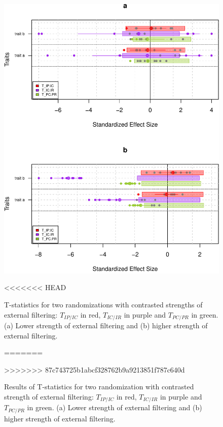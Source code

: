 \documentclass[12pt]{article}\usepackage[]{graphicx}\usepackage[]{color}
\makeatletter
\def\maxwidth{ %
  \ifdim\Gin@nat@width>\linewidth
    \linewidth
  \else
    \Gin@nat@width
  \fi
}
\newenvironment{knitrout}{}{} %
\makeatother
\begin{document}
\begin{landscape}
\begin{table}[ht]
{\begin{knitrout}
\begin{figure}
{\centering \includegraphics[width=\maxwidth]{figure/typical_results_external_filtering2-1} 

}

<<<<<<< HEAD
\caption[T-statistics for two randomizations with contrasted strengths of external filtering]{T-statistics for two randomizations with contrasted strengths of external filtering: $T_{IP/IC}$ in red, $T_{IC/IR}$ in purple and $T_{PC/PR}$ in green. (a) Lower strength of external filtering and (b) higher strength of external filtering.}\label{fig:typical_results_external_filtering2}
=======
\caption[Results of T-statistics for two randomization with contrasted strength of external filtering]{Results of T-statistics for two randomization with contrasted strength of external filtering: $T_{IP/IC}$ in red, $T_{IC/IR}$ in purple and $T_{PC/PR}$ in green. (a) Lower strength of external filtering and (b) higher strength of external filtering.}\label{fig:typical_results_external_filtering2}
>>>>>>> 87c743725b1abcf328762b9a9213851f787c640d
\end{figure}



\end{knitrout}}
\end{table}
\end{landscape}
\end{document}
